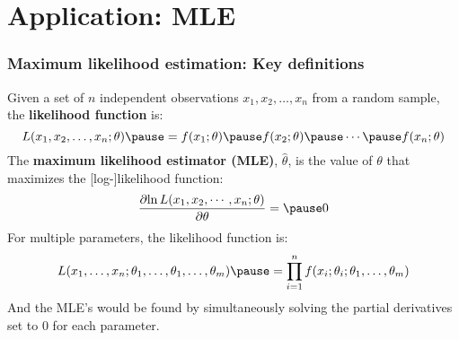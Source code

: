 \documentclass[smaller]{beamer}
\newcommand{\?}{\stackrel{?}{=}}
\newcommand{\rd}{\color{red}}
\newcommand{\bl}{\color{blue}}
\newcommand{\gr}{\color{green!40!black}}
\newcommand{\pd}[2]{\frac{\partial{#1}}{\partial{#2}}}
\begin{document}


  
  
  


\section{Application: MLE}
\begin{frame}
  \frametitle{Maximum likelihood estimation: Key definitions}\pause
  Given a set of $n$ independent observations $x_1,x_2,\ldots,x_n$ from a random sample, the \textbf{likelihood function} is:
  \begin{equation}
    \label{eq:11}
    L(x_1,x_2,\ldots,x_n;\theta) \pause = f(x_1;\theta) \pause f(x_2;\theta) \pause \cdots \pause f(x_n;\theta)
  \end{equation}
  \pause
  The \textbf{maximum likelihood estimator (MLE)}, $\hat\theta$, \pause is the value of $\theta$ that maximizes the [log-]likelihood function:\pause
  \begin{equation}
    \label{eq:12}
    \pd{\ln L(x_1,x_2,\cdots,x_n;\theta)}{\theta} = \pause 0
  \end{equation}
  \pause
  For multiple parameters, the likelihood function is:\pause
  \begin{equation}
    \label{eq:13}
    L(x_1,\ldots,x_n;\theta_1,\ldots,\theta_1,\ldots,\theta_m) \pause = \prod_{i=1}^n f(x_i;\theta_i;\theta_1,\ldots,\theta_m)
  \end{equation}
  \pause
  And the MLE's would be found by simultaneously solving the partial derivatives set to 0 for each parameter.
\end{frame}
\end{document}
